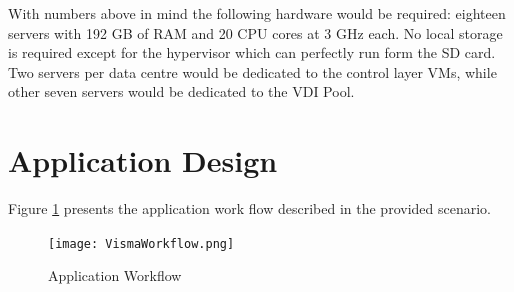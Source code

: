 \documentclass[a4paper]{article}
\begin{document}
	With numbers above in mind the following hardware would be required: eighteen servers with 192 GB of RAM and 20 CPU cores at 3 GHz each. No local storage is required except for the hypervisor which can perfectly run form the SD card. Two servers per data centre would be dedicated to the control layer VMs, while other seven servers would be dedicated to the VDI Pool. 	
	
	\section {Application Design}
	Figure \ref{fig:VismaWorkflow} presents the application work flow described in the provided scenario.
	\begin{figure}
		\centering
		\texttt{[image: VismaWorkflow.png]}
		\caption{\label{fig:VismaWorkflow}Application Workflow}
	\end{figure}

\end{document}
